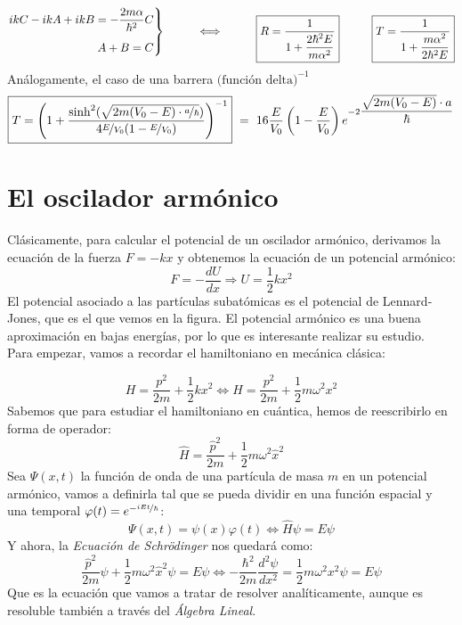\documentclass{report}
\begin{document}
            \[\begin{rcases}
              \begin{aligned}
                ikC-ikA+ikB=-\dfrac{2m\alpha}{\hbar^2}C\\[5pt]
                A+B=C
              \end{aligned}
            \end{rcases}\hspace{1cm}\Longleftrightarrow\hspace{1cm}\boxed{R=\dfrac{1}{1+\dfrac{2\hbar^2E}{m\alpha^2}}}\hspace{1cm}
            \boxed{T=\dfrac{1}{1+\dfrac{m\alpha^2}{2\hbar^2E}}}\]
            Análogamente, el caso de una barrera $\text{(función delta)}^{-1}$
            \[\boxed{T=\left(1+\dfrac{\sinh^2(\sqrt{2m(V_0-E)\cdot\nicefrac{a}{\hbar}})}
            {4\nicefrac{E}{V_0}(1-\nicefrac{E}{V_0})}\right)^{-1}}\ =\ 16\dfrac{E}{V_0}
            \left(1-\dfrac{E}{V_0}\right)e^{-2\dfrac{\sqrt{2m(V_0-E)}\cdot a}{\hbar}}\]
  \section{El oscilador armónico}    
    \noindent Clásicamente, para calcular el potencial de un oscilador armónico, derivamos 
    la ecuación de la fuerza $F=-kx$ y obtenemos la ecuación de un potencial armónico:
    \[F=-\dfrac{dU}{dx}\Longrightarrow U=\dfrac12 kx^2\]    
    El potencial asociado a las partículas subatómicas es el potencial de Lennard-Jones,
    que es el que vemos en la figura.
    El potencial armónico es una buena aproximación en bajas energías, por lo que es
    interesante realizar su estudio.\\

    \noindent Para empezar, vamos a recordar el hamiltoniano en mecánica clásica:

    \[H=\dfrac{p^2}{2m}+\dfrac12 kx^2\Longleftrightarrow H=\dfrac{p^2}{2m}+\dfrac12 m\omega^2 x^2\]
    Sabemos que para estudiar el hamiltoniano en cuántica, hemos de reescribirlo
    en forma de operador:
    \[\hat{H}=\dfrac{\hat{p}^2}{2m}+\dfrac12 m\omega^2\hat{x}^2\]
    Sea $\Psi(x,t)$ la función de onda de una partícula de masa $m$ en un potencial
    armónico, vamos a definirla tal que se pueda dividir en una función espacial
    y una temporal $\varphi(t)=e^{-\nicefrac{iE t}{\hbar}}$: 
    \[\Psi(x,t)=\psi(x)\varphi(t)\Longleftrightarrow \hat{H}\psi=E\psi\]
    Y ahora, la \textit{Ecuación de Schrödinger} nos quedará como:
    \[\dfrac{\hat{p}^2}{2m}\psi+\dfrac12 m\omega^2\hat{x}^2\psi=E\psi
    \Longleftrightarrow\boxed{-\dfrac{\hbar^2}{2m}\dfrac{d^2\psi}{dx^2}=
    \dfrac12 m\omega^2x^2\psi=E\psi}\]
    Que es la ecuación que vamos a tratar de resolver analíticamente,
    aunque es resoluble también a través del \textit{Álgebra Lineal}.\\
    
\end{document}
